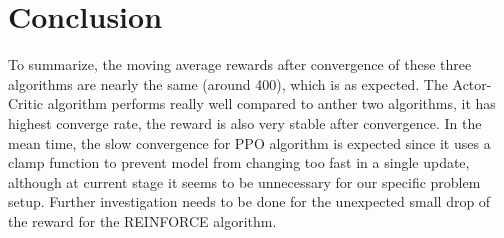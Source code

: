 \documentclass[balance,upint,subscriptcorrection,varvw,mathalfa=cal=boondoxo,pdf-a,nofoot]{asmeconf}
\begin{document}
\section{Conclusion}
\noindent To summarize, the moving average rewards after convergence of these 
three algorithms are nearly the same (around 400), which is as expected. 
The Actor-Critic algorithm performs really well compared to anther two 
algorithms, it has highest converge rate, the reward is also very stable after 
convergence. 
In the mean time, the slow convergence for PPO algorithm is expected since it 
uses a clamp function to prevent model from changing too fast in a single 
update, although at current stage it seems to be unnecessary for our specific 
problem setup. 
Further investigation needs to be done for the unexpected small drop of the 
reward for the REINFORCE algorithm.


\nocite{*}%


\end{document}
